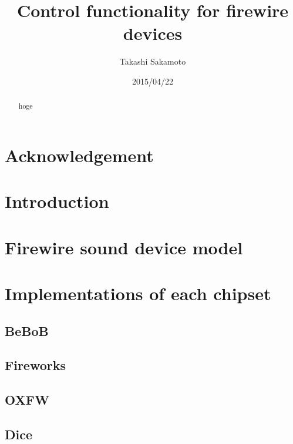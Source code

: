 \documentclass[onecolumn]{article}
\begin{document}

\title{Control functionality for firewire devices}
\author{Takashi Sakamoto}
\date{2015/04/22}
\maketitle{}

\begin{abstract}

hoge

\end{abstract}

\section*{Acknowledgement}

\newpage

\tableofcontents

\newpage


\section{Introduction}

\section{Firewire sound device model}



\section{Implementations of each chipset}

\subsection{BeBoB}

\subsection{Fireworks}

\subsection{OXFW}

\subsection{Dice}
\end{document}
